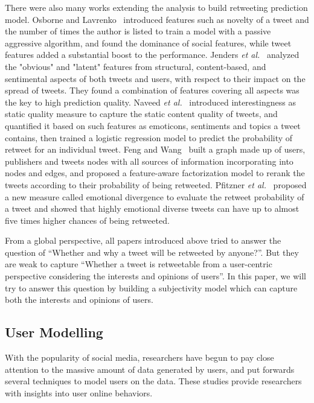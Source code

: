 \documentclass[smallcondensed]{svjour3}     %
\begin{document}
There were also many works extending the analysis to build retweeting prediction model. 
Osborne and Lavrenko~\cite{Osborne_Lavrenko_2011} introduced features such as novelty of a tweet and the number of times the author is listed to train a model with a passive aggressive algorithm, and found the dominance of social features, while tweet features added a substantial boost to the performance.
Jenders \emph{et al.}~\cite{Jenders:2013APV} analyzed the "obvious" and "latent" features from structural, content-based, and sentimental aspects of both tweets and users, with respect to their impact on the spread of tweets. 
They found a combination of features covering all aspects was the key to high prediction quality.
Naveed \emph{et al.}~\cite{Naveed:2011SMC,2011:NaveedGKC} introduced interestingness as static quality measure to capture the static content quality of tweets, and quantified it based on such features as emoticons, sentiments and topics a tweet contains, then trained a logistic regression model to predict the probability of retweet for an individual tweet.
Feng and Wang~\cite{conf/wsdm/FengW13} built a graph made up of users, publishers and tweets nodes with all sources of information incorporating into nodes and edges, and proposed a feature-aware factorization model to rerank the tweets according to their probability of being retweeted.
Pfitzner \emph{et al.}~\cite{conf/icwsm/PfitznerGS12} proposed a new measure called emotional divergence to evaluate the retweet probability of a tweet and showed that highly emotional diverse tweets can have up to almost five times higher chances of being retweeted.

From a global perspective, all papers introduced above tried to answer the question of ``Whether and why a tweet will be retweeted by anyone?''. 
But they are weak to capture ``Whether a tweet is retweetable from a user-centric perspective considering the interests and opinions of users''. 
In this paper, we will try to answer this question by building a subjectivity model  which can capture both the interests and opinions of users.

\subsection{User Modelling}
With the popularity of social media, researchers have begun to pay close attention to the massive amount of data generated by users, and put forwards several techniques to model users on the data. These studies provide researchers with insights into user online behaviors. 
\end{document}
